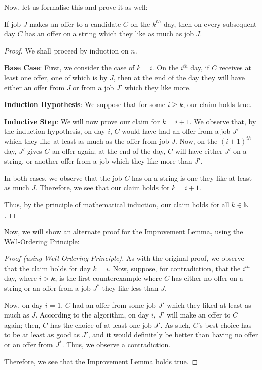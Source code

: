 \documentclass[openany]{book}
\newcommand{\NN}{\mathbb{N}}
\begin{document}
Now, let us formalise this and prove it as well:
\begin{lem}
	If job $J$ makes an offer to a candidate $C$ on the $k^{th}$ day, then on every subsequent day $C$ has an offer on a string which they like as much as job $J$.
\end{lem}
\begin{proof}
	We shall proceed by induction on $n$.
	
	\textbf{\underline{Base Case}}: First, we consider the case of $k=i$. On the $i^{th}$ day, if $C$ receives at least one offer, one of which is by $J$, then at the end of the day they will have either an offer from $J$ or from a job $J'$ which they like more.
	
	\textbf{\underline{Induction Hypothesis}}: We suppose that for some $i \geq k$, our claim holds true.
	
	\textbf{\underline{Inductive Step}}: We will now prove our claim for $k=i+1$. We observe that, by the induction hypothesis, on day $i$, $C$ would have had an offer from a job $J'$ which they like at least as much as the offer from job $J$. Now, on the $(i+1)^{th}$ day, $J'$ gives $C$ an offer again; at the end of the day, $C$ will have either $J'$ on a string, or another offer from a job which they like more than $J'$.
	
	In both cases, we observe that the job $C$ has on a string is one they like at least as much $J$. Therefore, we see that our claim holds for $k=i+1$.
	
	Thus, by the principle of mathematical induction, our claim holds for all $k \in \NN$.
\end{proof}

Now, we will show an alternate proof for the Improvement Lemma, using the Well-Ordering Principle:
\begin{proof}[Proof (using Well-Ordering Principle)]
	As with the original proof, we observe that the claim holds for day $k=i$. Now, suppose, for contradiction, that the $i^{th}$ day, where $i > k$, is the first counterexample where $C$ has either no offer on a string or an offer from a job $J^{*}$ they like less than $J$.
	
	Now, on day $i=1$, $C$ had an offer from some job $J'$ which they liked at least as much as $J$. According to the algorithm, on day $i$, $J'$ will make an offer to $C$ again; then, $C$ has the choice of at least one job $J'$. As such, $C$'s best choice has to be at least as good as $J'$, and it would definitely be better than having no offer or an offer from $J^{*}$. Thus, we observe a contradiction.
	
	Therefore, we see that the Improvement Lemma holds true.
\end{proof}
\end{document}
